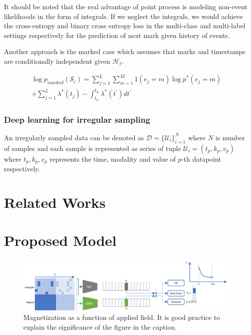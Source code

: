 \documentclass[journal,twoside,web]{ieeecolor}
\begin{document}
It should be noted that the real advantage of point process is modeling non-event likelihoods in the form of integrals. If we neglect the integrals, we would achieve the cross-entropy and binary cross entropy loss in the multi-class and multi-label settings respectively for the prediction of next mark given history of events.

Another approach is the marked case which assumes that marks and timestamps are conditionally independent given $\mathcal{H}_t$.

\begin{multline} 
    \log p_{marked}(\mathcal{S}_{i}) =    
    \sum_{j = 1}^{L}\sum_{m = 1}^{M} 1(e_j=m)   \log p^{*}(e_j=m) \\
    +\sum_{j = 1}^{L}\lambda^{*}(t_j) - \int_{t_0}^{t_{L}}\lambda^{*}(t^{\prime})dt^{\prime}  
\end{multline} 

\subsubsection*{Deep learning for irregular sampling}
An irregularly sampled data can be denoted as $\mathcal{D}=\{\mathcal{U}_i\}_{i=1}^{N}$ where $N$ is number of samples and each sample is represented as series of tuple $\mathcal{U}_i={(t_p,k_p,v_p)}$ where $t_p, k_p, v_p$ represents the time, modality and value of $p$-th datapoint respectively.

\section{Related Works}
\label{sec:Related Works}

\section{Proposed Model}
\label{sec:Proposed Model}


\begin{figure}[!t]
\centerline{\includegraphics{images/model_arch.png}}
\caption{Magnetization as a function of applied field.
It is good practice to explain the significance of the figure in the caption.}
\label{fig1}
\end{figure}
\end{document}
